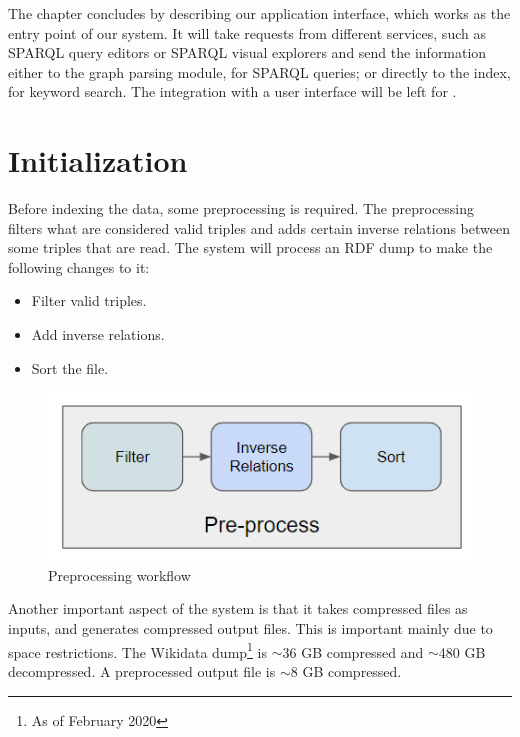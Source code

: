 The chapter concludes by describing our application interface, which works as the entry point of our system. 
It will take requests from different services, such as SPARQL query editors or SPARQL visual explorers and send the information either to the graph parsing module, for SPARQL queries; 
or directly to the index, for keyword search. 
The integration with a user interface will be left for .


\section{Initialization}
\label{chap:init}

Before indexing the data, some preprocessing is required. 
The preprocessing filters what are considered valid triples and adds certain inverse relations between some triples that are read. 
The system will process an RDF dump to make the following changes to it:
\begin{itemize}
    \item Filter valid triples.
    \item Add inverse relations.
    \item Sort the file.
\end{itemize}

\begin{figure}[H]
    \centering
        \includegraphics[width=0.5\linewidth]{imagenes/Preprocess.png}
        \caption{Preprocessing workflow}
        \label{fig:preprocess}
\end{figure}

Another important aspect of the system is that it takes compressed files as inputs, and generates compressed output files. 
This is important mainly due to space restrictions. 
The Wikidata dump\footnote{As of February 2020} is $\sim$36 GB compressed and $\sim$480 GB decompressed.
A preprocessed output file is $\sim$8 GB compressed. 

